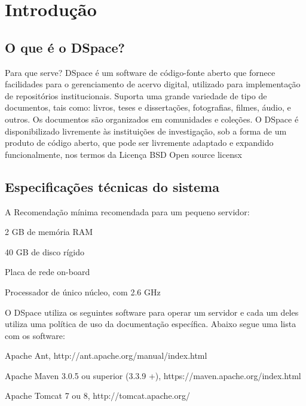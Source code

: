 \documentclass[12pt,hidelinks]{article}
\begin{document}
\section{Introdução}
\newpage
    \subsection{O que é o DSpace?}
        Para que serve?
        DSpace é um software de código-fonte aberto que fornece facilidades para o gerenciamento de acervo digital, utilizado para implementação de repositórios institucionais. Suporta uma grande variedade de tipo de documentos, tais como: livros, teses e dissertações, fotografias, filmes, áudio, e outros. Os documentos são organizados em comunidades e coleções.
        O DSpace é disponibilizado livremente às instituições de investigação, sob a forma de um produto de código aberto, que pode ser livremente adaptado e expandido funcionalmente, nos termos da Licença BSD Open source licensx

    \subsection{Especificações técnicas do sistema}
        A Recomendação mínima recomendada para um pequeno servidor:
        
    \singlespacing \textbullet \hspace{6pt} 2 GB de memória RAM
 
    \textbullet \hspace{6pt} 40 GB de disco rígido
 
    \textbullet \hspace{6pt} Placa de rede on-board
 
    \textbullet \hspace{6pt} Processador de único núcleo, com 2.6 GHz

    \singlespacing  O DSpace utiliza os seguintes software para operar um servidor e cada um deles utiliza uma política de uso da documentação específica. Abaixo segue uma lista com os software: 
 
    \singlespacing \textbullet \hspace{6pt} Apache Ant, http://ant.apache.org/manual/index.html
  
    \textbullet \hspace{6pt} Apache Maven 3.0.5 ou superior (3.3.9 +), https://maven.apache.org/index.html
  
    \textbullet \hspace{6pt} Apache Tomcat 7 ou 8, http://tomcat.apache.org/
 
\end{document}
